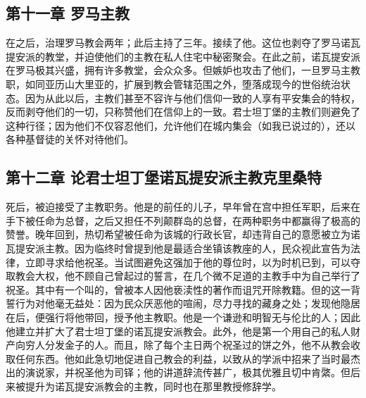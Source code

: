 \subsection{第十一章 罗马主教}

在之后，治理罗马教会两年；此后主持了三年。接续了他。这位也剥夺了罗马诺瓦提安派的教堂，并迫使他们的主教在私人住宅中秘密聚会。在此之前，诺瓦提安派在罗马极其兴盛，拥有许多教堂，会众众多。但嫉妒也攻击了他们，一旦罗马主教职，如同亚历山大里亚的，扩展到教会管辖范围之外，堕落成现今的世俗统治状态。因为从此以后，主教们甚至不容许与他们信仰一致的人享有平安集会的特权，反而剥夺他们的一切，只称赞他们在信仰上的一致。君士坦丁堡的主教们则避免了这种行径；因为他们不仅容忍他们，允许他们在城内集会（如我已说过的），还以各种基督徒的关怀对待他们。\par


\subsection{第十二章 论君士坦丁堡诺瓦提安派主教克里桑特}

死后，被迫接受了主教职务。他是的前任的儿子，早年曾在宫中担任军职，后来在手下被任命为总督，之后又担任不列颠群岛的总督，在两种职务中都赢得了极高的赞誉。晚年回到，热切希望被任命为该城的行政长官，却违背自己的意愿被立为诺瓦提安派主教。因为临终时曾提到他是最适合坐镇该教座的人，民众视此宣告为法律，立即寻求给他祝圣。当试图避免这强加于他的尊位时，以为时机已到，可以夺取教会大权，他不顾自己曾起过的誓言，在几个微不足道的主教手中为自己举行了祝圣。其中有一个叫的，曾被本人因他亵渎性的著作而诅咒开除教籍。但的这一背誓行为对他毫无益处：因为民众厌恶他的喧闹，尽力寻找的藏身之处；发现他隐居在后，便强行将他带回，授予他主教职。他是一个谦逊和明智无与伦比的人；因此他建立并扩大了君士坦丁堡的诺瓦提安派教会。此外，他是第一个用自己的私人财产向穷人分发金子的人。而且，除了每个主日两个祝圣过的饼之外，他不从教会收取任何东西。他如此急切地促进自己教会的利益，以致从的学派中招来了当时最杰出的演说家，并祝圣他为司铎；他的讲道辞流传甚广，极其优雅且切中肯綮。但后来被提升为诺瓦提安派教会的主教，同时也在那里教授修辞学。\par

